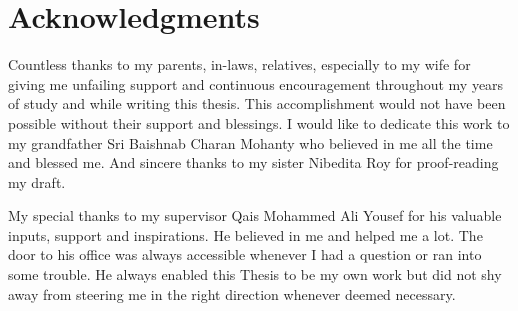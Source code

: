 


\pagestyle{empty}
\begin{abstractpage}

\end{abstractpage}

% 


\section*{Acknowledgments}
Countless thanks to my parents, in-laws, relatives, especially to my wife
for giving me unfailing support and continuous encouragement throughout my 
years of study and while writing this thesis. This accomplishment would not 
have been possible without their support and blessings. I would like to 
dedicate this work to my grandfather Sri Baishnab Charan Mohanty who 
believed in me all the time and blessed me. And sincere thanks to my sister Nibedita Roy for proof-reading my draft.

\vspace{1em}
\noindent My special thanks to my supervisor Qais Mohammed Ali Yousef for his valuable
inputs, support and inspirations. He believed in me and helped me a lot.
The door to his office was always accessible whenever I had a question 
or ran into some trouble. He always enabled this Thesis to be my own work 
but did not shy away from steering me in the right direction whenever deemed necessary.

